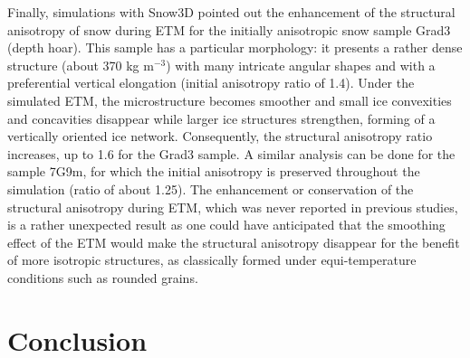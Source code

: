 \documentclass[draft,ms]{agujournal2019}
\begin{document}
Finally, simulations with Snow3D pointed out the enhancement of the structural anisotropy of snow during ETM for the initially anisotropic snow sample Grad3 (depth hoar). This sample has a particular morphology: it presents a rather dense structure (about 370 kg m$^{-3}$) with many intricate angular shapes and with a preferential vertical elongation (initial anisotropy ratio of 1.4).
Under the simulated ETM, the microstructure becomes smoother and small ice convexities and concavities disappear while larger ice structures strengthen, forming of a vertically oriented ice network. Consequently, the structural anisotropy ratio increases, up to 1.6 for the Grad3 sample. A similar analysis can be done for the sample 7G9m, for which the initial anisotropy is preserved throughout the simulation (ratio of about 1.25). The enhancement or conservation of the structural anisotropy during ETM, which was never reported in previous studies, is a rather unexpected result as one could have anticipated that the smoothing effect of the ETM would make the structural anisotropy disappear for the benefit of more isotropic structures, as classically formed under equi-temperature conditions such as rounded grains. 

\section{Conclusion}
\label{sec:conclusion}
\end{document}
